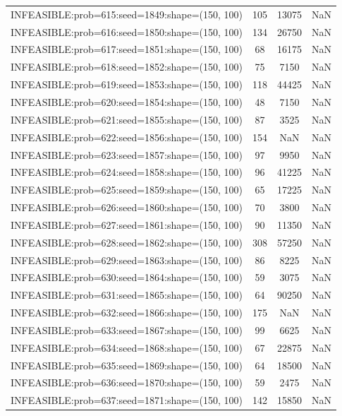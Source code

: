 \begin{longtable}{lccc}
INFEASIBLE:prob=615:seed=1849:shape=(150, 100) &   105 & 13075 &    NaN \\
INFEASIBLE:prob=616:seed=1850:shape=(150, 100) &   134 & 26750 &    NaN \\
INFEASIBLE:prob=617:seed=1851:shape=(150, 100) &    68 & 16175 &    NaN \\
INFEASIBLE:prob=618:seed=1852:shape=(150, 100) &    75 &  7150 &    NaN \\
INFEASIBLE:prob=619:seed=1853:shape=(150, 100) &   118 & 44425 &    NaN \\
INFEASIBLE:prob=620:seed=1854:shape=(150, 100) &    48 &  7150 &    NaN \\
INFEASIBLE:prob=621:seed=1855:shape=(150, 100) &    87 &  3525 &    NaN \\
INFEASIBLE:prob=622:seed=1856:shape=(150, 100) &   154 &   NaN &    NaN \\
INFEASIBLE:prob=623:seed=1857:shape=(150, 100) &    97 &  9950 &    NaN \\
INFEASIBLE:prob=624:seed=1858:shape=(150, 100) &    96 & 41225 &    NaN \\
INFEASIBLE:prob=625:seed=1859:shape=(150, 100) &    65 & 17225 &    NaN \\
INFEASIBLE:prob=626:seed=1860:shape=(150, 100) &    70 &  3800 &    NaN \\
INFEASIBLE:prob=627:seed=1861:shape=(150, 100) &    90 & 11350 &    NaN \\
INFEASIBLE:prob=628:seed=1862:shape=(150, 100) &   308 & 57250 &    NaN \\
INFEASIBLE:prob=629:seed=1863:shape=(150, 100) &    86 &  8225 &    NaN \\
INFEASIBLE:prob=630:seed=1864:shape=(150, 100) &    59 &  3075 &    NaN \\
INFEASIBLE:prob=631:seed=1865:shape=(150, 100) &    64 & 90250 &    NaN \\
INFEASIBLE:prob=632:seed=1866:shape=(150, 100) &   175 &   NaN &    NaN \\
INFEASIBLE:prob=633:seed=1867:shape=(150, 100) &    99 &  6625 &    NaN \\
INFEASIBLE:prob=634:seed=1868:shape=(150, 100) &    67 & 22875 &    NaN \\
INFEASIBLE:prob=635:seed=1869:shape=(150, 100) &    64 & 18500 &    NaN \\
INFEASIBLE:prob=636:seed=1870:shape=(150, 100) &    59 &  2475 &    NaN \\
INFEASIBLE:prob=637:seed=1871:shape=(150, 100) &   142 & 15850 &    NaN \\

\end{longtable}
